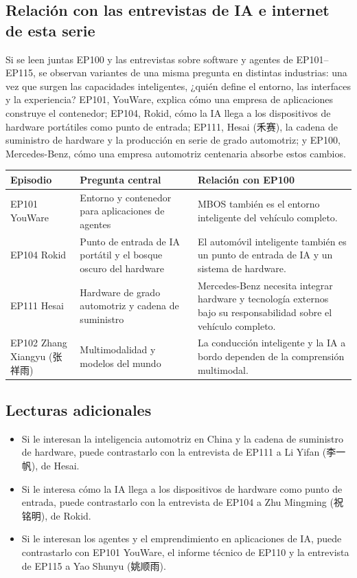 \subsection{Relación con las entrevistas de IA e internet de esta serie}

Si se leen juntas EP100 y las entrevistas sobre software y agentes de EP101--EP115, se observan variantes de una misma pregunta en distintas industrias: una vez que surgen las capacidades inteligentes, ¿quién define el entorno, las interfaces y la experiencia? EP101, YouWare, explica cómo una empresa de aplicaciones construye el contenedor; EP104, Rokid, cómo la IA llega a los dispositivos de hardware portátiles como punto de entrada; EP111, Hesai (禾赛), la cadena de suministro de hardware y la producción en serie de grado automotriz; y EP100, Mercedes-Benz, cómo una empresa automotriz centenaria absorbe estos cambios.

\noindent\begin{tabularx}{\textwidth}{p{}p{}X}
\toprule
Episodio & Pregunta central & Relación con EP100 \\
\midrule
EP101 YouWare & Entorno y contenedor para aplicaciones de agentes & MBOS también es el entorno inteligente del vehículo completo. \\
EP104 Rokid & Punto de entrada de IA portátil y el bosque oscuro del hardware & El automóvil inteligente también es un punto de entrada de IA y un sistema de hardware. \\
EP111 Hesai & Hardware de grado automotriz y cadena de suministro & Mercedes-Benz necesita integrar hardware y tecnología externos bajo su responsabilidad sobre el vehículo completo. \\
EP102 Zhang Xiangyu (张祥雨) & Multimodalidad y modelos del mundo & La conducción inteligente y la IA a bordo dependen de la comprensión multimodal. \\
\bottomrule
\end{tabularx}

\subsection{Lecturas adicionales}

\begin{itemize}
\item Si le interesan la inteligencia automotriz en China y la cadena de suministro de hardware, puede contrastarlo con la entrevista de EP111 a Li Yifan (李一帆), de Hesai.
\item Si le interesa cómo la IA llega a los dispositivos de hardware como punto de entrada, puede contrastarlo con la entrevista de EP104 a Zhu Mingming (祝铭明), de Rokid.
\item Si le interesan los agentes y el emprendimiento en aplicaciones de IA, puede contrastarlo con EP101 YouWare, el informe técnico de EP110 y la entrevista de EP115 a Yao Shunyu (姚顺雨).
\end{itemize}


